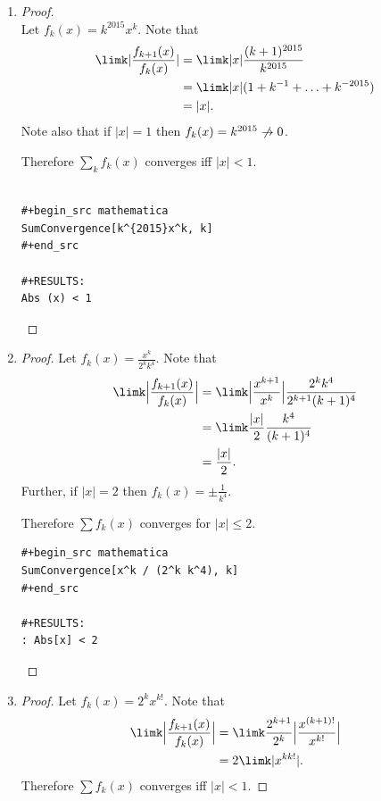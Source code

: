 \documentclass[12pt]{article}
\begin{document}
\begin{enumerate}[label=(\alph*)]
\item
  \begin{proof}~\\
    Let $f_k(x) = k^{2015}x^k$. Note that
    \begin{align*}
      \limk |\frac{f_{k+1}(x)}{f_k(x)}|
      &= \limk |x| \frac{(k+1)^{2015}}{k^{2015}}\\
      &= \limk |x| (1 + k^{-1} + \ldots + k^{-2015})\\
      &= |x|.
    \end{align*}
    Note also that if $|x| = 1$ then $f_k(x) = k^{2015} \centernot\to 0$.

    Therefore $\sum_k f_k(x)$ converges iff $|x| < 1$.
\begin{verbatim}

#+begin_src mathematica
SumConvergence[k^{2015}x^k, k]
#+end_src

#+RESULTS:
Abs (x) < 1
\end{verbatim}
\checkmark

  \end{proof}

\item
  \begin{proof}
    Let $f_k(x) = \frac{x^k}{2^kk^4}$. Note that
    \begin{align*}
      \limk \Big|\frac{f_{k+1}(x)}{f_k(x)}\Big|
      &= \limk \Big|\frac{x^{k+1}}{x^k}\Big|\frac{2^kk^4}{2^{k+1}(k+1)^4}\\
      &= \limk \frac{|x|}{2} \frac{k^4}{(k+1)^4}\\
      &= \frac{|x|}{2}.
    \end{align*}
    Further, if $|x| = 2$ then $f_k(x) = \pm \frac{1}{k^4}$.

    Therefore $\sum f_k(x)$ converges for $|x| \leq 2$.

\begin{verbatim}
#+begin_src mathematica
SumConvergence[x^k / (2^k k^4), k]
#+end_src

#+RESULTS:
: Abs[x] < 2

\end{verbatim}


 \end{proof}

\item
  \begin{proof}
    Let $f_k(x) = 2^kx^{k!}$. Note that
    \begin{align*}
      \limk \Big|\frac{f_{k+1}(x)}{f_k(x)}\Big|
      &= \limk \frac{2^{k+1}}{2^k} \Big|\frac{x^{(k+1)!}}{x^{k!}}\Big|\\
      &= 2 \limk |x^{kk!}|.
    \end{align*}
    Therefore $\sum f_k(x)$ converges iff $|x| < 1$.


\end{proof}
\end{enumerate}
\end{document}
